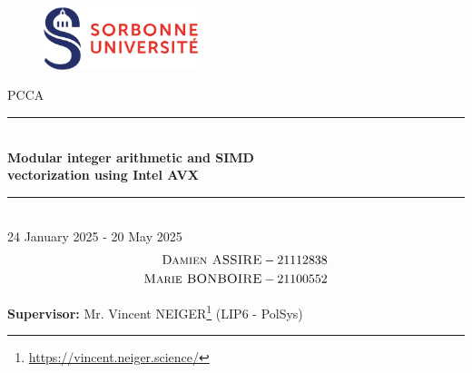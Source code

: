 \documentclass[a4paper]{article}
\begin{document}
\thispagestyle{plain}
\begin{titlepage}
    \begin{figure}[h]
        \centering
        \includegraphics[width=0.4\textwidth]{su.png}
    \end{figure}
    \vspace{1cm}

    \begin{center}
        {\LARGE PCCA}\\[0.3cm]
        \rule{\linewidth}{0.5mm} \\[0.4cm]
        {\huge \textbf{Modular integer arithmetic and SIMD \\ vectorization using Intel AVX}}\\[0.4cm]
        \rule{\linewidth}{0.5mm} \\[1cm]
        {\large 24 January 2025 - 20 May 2025}\\[3cm]

        {\Large 
            \begin{align*}
                \textsc{Damien ASSIRE}  &- 21112838 \\
                \textsc{Marie BONBOIRE} &- 21100552
            \end{align*}
        }


    \end{center}

    \vfill
\begin{flushleft}{\large
    \textbf{Supervisor:} Mr. Vincent NEIGER\footnote{\url{https://vincent.neiger.science/}} (LIP6 - PolSys)\\
    }
\end{flushleft}
\end{titlepage}
\newpage

\tableofcontents
\newpage
\end{document}
